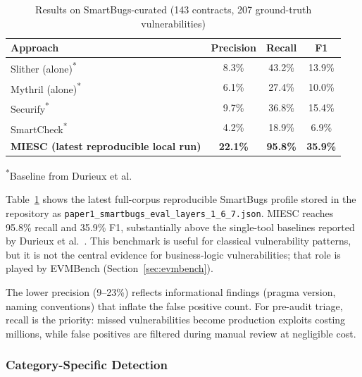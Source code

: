 \documentclass[conference]{IEEEtran}
\begin{document}
\begin{table}[htbp]
\caption{Results on SmartBugs-curated (143 contracts, 207 ground-truth vulnerabilities)}
\label{tab:smartbugs}
\centering
\begin{tabular}{@{}lccc@{}}
\toprule
\textbf{Approach} & \textbf{Precision} & \textbf{Recall} & \textbf{F1} \\
\midrule
Slither (alone)\textsuperscript{*} & 8.3\% & 43.2\% & 13.9\% \\
Mythril (alone)\textsuperscript{*} & 6.1\% & 27.4\% & 10.0\% \\
Securify\textsuperscript{*} & 9.7\% & 36.8\% & 15.4\% \\
SmartCheck\textsuperscript{*} & 4.2\% & 18.9\% & 6.9\% \\
\midrule
\textbf{MIESC (latest reproducible local run)} & \textbf{22.1\%} & \textbf{95.8\%} & \textbf{35.9\%} \\
\bottomrule
\end{tabular}

\vspace{2pt}
\footnotesize{\textsuperscript{*}Baseline from Durieux et al.~\cite{durieux2020empirical}}
\end{table}

Table~\ref{tab:smartbugs} shows the latest full-corpus reproducible SmartBugs profile stored in the repository as \texttt{paper1\_smartbugs\_eval\_layers\_1\_6\_7.json}. MIESC reaches 95.8\% recall and 35.9\% F1, substantially above the single-tool baselines reported by Durieux et al.~\cite{durieux2020empirical}. This benchmark is useful for classical vulnerability patterns, but it is not the central evidence for business-logic vulnerabilities; that role is played by EVMBench (Section~\ref{sec:evmbench}).

The lower precision (9--23\%) reflects informational findings (pragma version, naming conventions) that inflate the false positive count. For pre-audit triage, recall is the priority: missed vulnerabilities become production exploits costing millions, while false positives are filtered during manual review at negligible cost.

\subsubsection{Category-Specific Detection}
\end{document}

